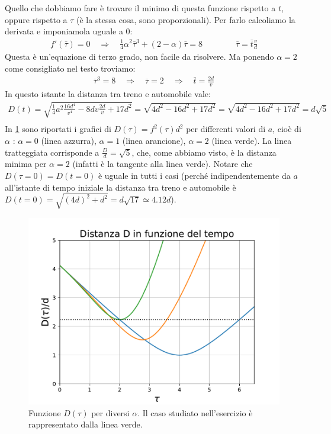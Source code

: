 \documentclass[12pt,a4paper]{book}
\begin{document}
%
Quello che dobbiamo fare è trovare il minimo di questa funzione rispetto a $t$, oppure rispetto a $\tau$ (è la stessa cosa, sono proporzionali). Per farlo calcoliamo la derivata e imponiamola uguale a $0$:
%
\begin{gather*}
f'(\bar{\tau})=0 \quad \Rightarrow \quad \frac{1}{4}\alpha^2 \bar{\tau}^3+(2-\alpha)\bar{\tau}=8 \qquad \qquad \bar{\tau}=\bar{t}\frac{v}{d}
\end{gather*}
%
Questa è un'equazione di terzo grado, non facile da risolvere. 
Ma ponendo $\alpha=2$ come consigliato nel testo troviamo:
%
\begin{gather*}
\bar{\tau}^3=8 \quad \Rightarrow \quad  \bar{\tau}=2 \quad \Rightarrow \quad  \bar{t}=\frac{2d}{v}
\end{gather*}
%
In questo istante la distanza tra treno e automobile vale: 
%
\begin{gather*}
D(t)=\sqrt{\frac{1}{4}a^2 \frac{16d^4}{v^4}-8dv\frac{2d}{v}+17d^2}=\sqrt{4d^2-16d^2+17d^2}=\sqrt{4d^2-16d^2+17d^2}=d\sqrt{5}\\
\end{gather*}
%
In \ref{fig:distanza} sono riportati i grafici di $D(\tau)=f^2(\tau)d^2$ per differenti valori di $a$, cioè di $\alpha$ : $\alpha=0$ (linea azzurra), $\alpha=1$ (linea arancione), $\alpha=2$ (linea verde). La linea tratteggiata corrisponde a $\frac{D}{d}=\sqrt{5}$, che, come abbiamo visto, è la distanza minima per $\alpha=2$ (infatti è la tangente alla linea verde). Notare che $D(\tau=0)=D(t=0)$
è uguale in tutti i casi (perché indipendentemente da $a$ all'istante di tempo iniziale la distanza tra treno e automobile è $D(t=0)=\sqrt{(4d)^2+d^2}=d\sqrt{17}\simeq 4.12 d$).  
 \begin{figure}[!ht]
 \centering
\includegraphics[scale=0.55]{distanza.pdf}
\caption{Funzione $D(\tau)$ per diversi $\alpha$. Il caso studiato nell'esercizio è rappresentato dalla linea verde. \label{fig:distanza} }
\end{figure}
\end{document}

